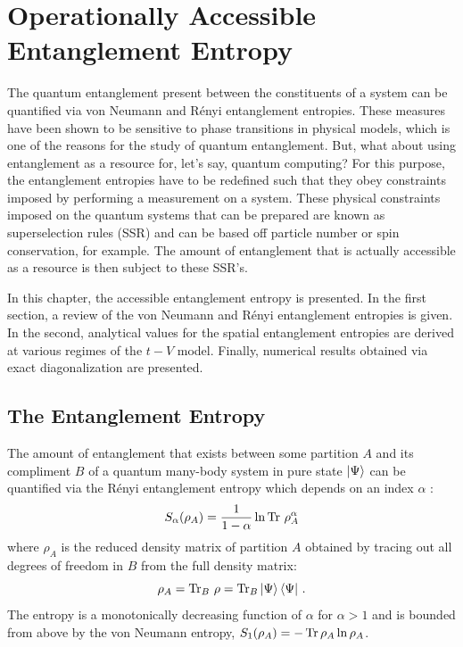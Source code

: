 \section{Operationally Accessible Entanglement Entropy}

The quantum entanglement present between the constituents of a system can be quantified via von Neumann and R\'enyi entanglement entropies. These measures have been shown to be sensitive to phase transitions in physical models, which is one of the reasons for the study of quantum entanglement. But, what about using entanglement as a resource for, let's say, quantum computing? For this purpose, the entanglement entropies have to be redefined such that they obey constraints imposed by performing a measurement on a system. These physical constraints imposed on the quantum systems that can be prepared are known as superselection rules (SSR) and can be based off particle number or spin conservation, for example. The amount of entanglement that is actually accessible as a resource is then subject to these SSR's.

In this chapter, the accessible entanglement entropy is presented. In the first section, a review of the von Neumann and R\'enyi entanglement entropies is given. In the second, analytical values for the spatial entanglement entropies are derived at various regimes of the $t-V$ model. Finally, numerical results obtained via exact diagonalization are presented.

\subsection{The \ren Entanglement Entropy}
\label{sec:accEntanglementIntro}

The amount of entanglement that exists between some partition $A$ and its compliment $B$ of a quantum many-body system in pure state $\ket{\Psi}$ can be quantified via the R\'{e}nyi entanglement entropy which depends on an index $\alpha$ :
%
\begin{equation}
S_{\alpha} (\rho_A) = \frac{1}{1-\alpha}\ln \operatorname{Tr}\, \rho_A^{\alpha}
\label{eq:S_alpha}
\end{equation}
%
where $\rho_{A}$ is the reduced density matrix of partition $A$ obtained by
tracing out all degrees of freedom in $B$ from the full density matrix:
%
\begin{equation}
\rho_{A} = \operatorname{Tr}_{B}\, \rho = \operatorname{Tr}_{B} \ket{\Psi}\bra{\Psi}\,.
\end{equation}
%
The \ren entropy is a monotonically decreasing function of $\alpha$ for $\alpha
> 1$ and is bounded from above by the von Neumann entropy, $S_1(\rho_A) = -\operatorname{Tr} \rho_A \ln \rho_A$.

